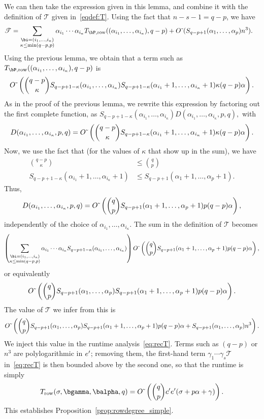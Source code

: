 \documentclass[12pt]{article}
\begin{document}
We can then take the expression given in this lemma, and combine it
with the definition of $\mathscr{T}$ given in~\eqref{eqdef:T}. Using  the fact that
$n-s-1 = q-p$, we have
\begin{align*}
\mathscr{T}&=\sum_{\substack{\bi=(i_1,\dots,i_\kappa)\\ \kappa\le\min(q-p,p)}}
\alpha_{i_1} \cdots \alpha_{i_\kappa} T_{\bP,{\rm row}}((\alpha_{i_1},\dots,\alpha_{i_\kappa}), q-p)
+
\softO( S_{q-p+1}(\alpha_1,\dots,\alpha_p) n^3).
\end{align*}
Using the previous lemma,
we obtain that a term such as $T_{\bP,{\rm row}}((\alpha_{i_1},\dots,\alpha_{i_\kappa}),q-p)$
is
$$
 {O}{\,\tilde{ }\,}\left ({q-p \choose \kappa} 
S_{q-p+1-\kappa}(\alpha_{i_1},\dots,\alpha_{i_\kappa}) 
S_{q-p+1-\kappa}(\alpha_{i_1}+1,\dots,\alpha_{i_\kappa}+1) \kappa (q-p) \alpha \right ).$$
As in the proof of the previous lemma,  we rewrite this expression by
factoring out the first complete function, as
$S_{q-p+1-\kappa}(\alpha_{i_1},\dots,\alpha_{i_\kappa}) D(\alpha_{i_1},\dots,\alpha_{i_\kappa},p,q),$ with
$$
D(\alpha_{i_1},\dots,\alpha_{i_\kappa},p,q)= {O}{\,\tilde{ }\,}\left ({q-p \choose \kappa} 
 S_{q-p+1-\kappa}(\alpha_{i_1}+1,\dots,\alpha_{i_\kappa}+1) \kappa (q-p) \alpha \right ).$$
Now, we use the fact that (for the values of $\kappa$ that show up
in the sum), we have
\begin{align*}
{q-p \choose \kappa} & \le {q \choose p}\\
S_{q-p+1-\kappa}(\alpha_{i_1}+1,\dots,\alpha_{i_\kappa}+1) & \le S_{q-p+1}(\alpha_{1}+1,\dots,\alpha_{p}+1).
\end{align*}
Thus, 
$$
D(\alpha_{i_1},\dots,\alpha_{i_\kappa},p,q)= {O}{\,\tilde{ }\,}\left ( 
{q \choose p}  S_{q-p+1}(\alpha_{1}+1,\dots,\alpha_{p}+1) p(q-p)\alpha\right ),$$
independently of the choice of $\alpha_{i_1},\dots,\alpha_{i_\kappa}$.
The sum in the definition of $\mathscr{T}$ becomes
\[
\left(\sum_{\substack{\bi=(i_1,\dots,i_\kappa)\\ \kappa\le\min(q-p,p)}}
\alpha_{i_1} \cdots \alpha_{i_\kappa} 
S_{q-p+1-\kappa}(\alpha_{i_1},\dots,\alpha_{i_\kappa})\right)
\softO\left ( 
{q \choose p}  S_{q-p+1}(\alpha_{1}+1,\dots,\alpha_{p}+1) p(q-p)\alpha\right ),
\]
or equivalently
\[
{O}{\,\tilde{ }\,}\left ( 
{q \choose p}  S_{q-p+1}(\alpha_{1},\dots,\alpha_{p}) S_{q-p+1}(\alpha_{1}+1,\dots,\alpha_{p}+1)p(q-p)\alpha \right ).
\]
The value of $\mathscr{T}$ we infer from this is
\[
{O}{\,\tilde{ }\,}\left ( 
{q \choose p}  S_{q-p+1}(\alpha_{1},\dots,\alpha_{p}) S_{q-p+1}(\alpha_{1}+1,\dots,\alpha_{p}+1)p(q-p)\alpha 
+  S_{q-p+1}(\alpha_{1},\dots,\alpha_{p}) n^3\right ).
\]
We inject this value in the runtime analysis~\eqref{eq:recT}. Terms
such as $(q-p)$ or $n^3$ are polylogarithmic in ${e'}{}$; removing them,
the first-hand term $\gamma_1 \cdots \gamma_s \mathscr{T}$ in~\eqref{eq:recT} is
then bounded above by the second one, so that the runtime is simply
\begin{align}\label{eq:recTT}
  T_{\rm row}(\sigma,\bgamma,\balpha,q)=  \softO\left (  {q \choose p}  \rc  \re ( \sigma + p \alpha +\gamma )  \right ).
\end{align}
This establishes Proposition~\ref{prop:rowdegree_simple}.
\end{document}
